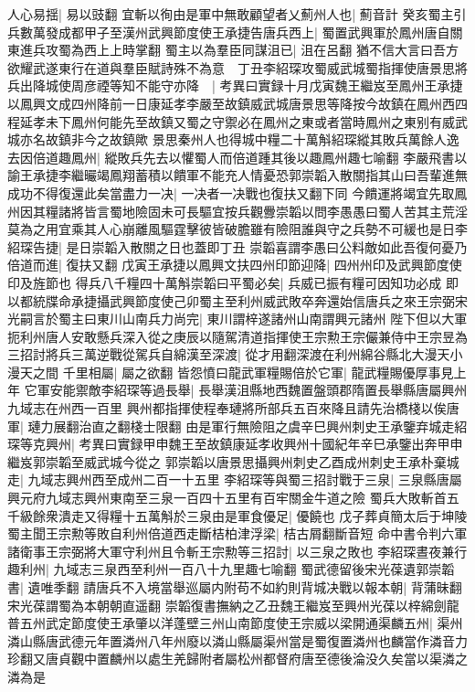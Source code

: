 人心易揺|{
	易以豉翻}
宜斬以徇由是軍中無敢顧望者乂薊州人也|{
	薊音計}
癸亥蜀主引兵數萬發成都甲子至漢州武興節度使王承捷告唐兵西上|{
	蜀置武興軍於鳳州唐自關東進兵攻蜀為西上上時掌翻}
蜀主以為羣臣同謀沮已|{
	沮在呂翻}
猶不信大言曰吾方欲耀武遂東行在道與羣臣賦詩殊不為意　丁丑李紹琛攻蜀威武城蜀指揮使唐景思將兵出降城使周彦禋等知不能守亦降　|{
	考異曰實録十月戊寅魏王繼岌至鳳州王承捷以鳳興文成四州降前一日康延孝李嚴至故鎮威武城唐景思等降按今故鎮在鳳州西四程延孝未下鳳州何能先至故鎮又蜀之守禦必在鳳州之東或者當時鳳州之東别有威武城亦名故鎮非今之故鎮歟}
景思秦州人也得城中糧二十萬斛紹琛縱其敗兵萬餘人逸去因倍道趣鳳州|{
	縱敗兵先去以懼蜀人而倍道踵其後以趣鳳州趣七喻翻}
李嚴飛書以諭王承捷李繼曮竭鳳翔蓄積以饋軍不能充人情憂恐郭崇韜入散關指其山曰吾輩進無成功不得復還此矣當盡力一决|{
	一决者一决戰也復扶又翻下同}
今饋運將竭宜先取鳳州因其糧諸將皆言蜀地險固未可長驅宜按兵觀釁崇韜以問李愚愚曰蜀人苦其主荒淫莫為之用宜乘其人心崩離風驅霆擊彼皆破膽雖有險阻誰與守之兵勢不可緩也是日李紹琛告捷|{
	是日崇韜入散關之日也蓋即丁丑}
崇韜喜謂李愚曰公料敵如此吾復何憂乃倍道而進|{
	復扶又翻}
戊寅王承捷以鳳興文扶四州印節迎降|{
	四州州印及武興節度使印及旌節也}
得兵八千糧四十萬斛崇韜曰平蜀必矣|{
	兵威已振有糧可因知功必成}
即以都統牒命承捷攝武興節度使己卯蜀主至利州威武敗卒奔還始信唐兵之來王宗弼宋光嗣言於蜀主曰東川山南兵力尚完|{
	東川謂梓遂諸州山南謂興元諸州}
陛下但以大軍扼利州唐人安敢懸兵深入從之庚辰以隨駕清道指揮使王宗勲王宗儼兼侍中王宗昱為三招討將兵三萬逆戰從駕兵自綿漢至深渡|{
	從才用翻深渡在利州綿谷縣北大漫天小漫天之間}
千里相屬|{
	屬之欲翻}
皆怨憤曰龍武軍糧賜倍於它軍|{
	龍武糧賜優厚事見上年}
它軍安能禦敵李紹琛等過長舉|{
	長舉漢沮縣地西魏置盤頭郡隋置長舉縣唐屬興州九域志在州西一百里}
興州都指揮使程奉璉將所部兵五百來降且請先治橋棧以俟唐軍|{
	璉力展翻治直之翻棧士限翻}
由是軍行無險阻之虞辛巳興州刺史王承鑒弃城走紹琛等克興州|{
	考異曰實録甲申魏王至故鎮康延孝收興州十國紀年辛巳承鑒出奔甲申繼岌郭崇韜至威武城今從之}
郭崇韜以唐景思攝興州刺史乙酉成州刺史王承朴棄城走|{
	九域志興州西至成州二百一十五里}
李紹琛等與蜀三招討戰于三泉|{
	三泉縣唐屬興元府九域志興州東南至三泉一百四十五里有百牢關金牛道之險}
蜀兵大敗斬首五千級餘衆潰走又得糧十五萬斛於三泉由是軍食優足|{
	優饒也}
戊子葬貞簡太后于坤陵蜀主聞王宗勲等敗自利州倍道西走斷桔柏津浮梁|{
	桔古屑翻斷音短}
命中書令判六軍諸衛事王宗弼將大軍守利州且令斬王宗勲等三招討|{
	以三泉之敗也}
李紹琛晝夜兼行趣利州|{
	九域志三泉西至利州一百八十九里趣七喻翻}
蜀武德留後宋光葆遺郭崇韜書|{
	遺唯季翻}
請唐兵不入境當舉巡屬内附苟不如約則背城决戰以報本朝|{
	背蒲昧翻宋光葆謂蜀為本朝朝直遥翻}
崇韜復書撫納之乙丑魏王繼岌至興州光葆以梓綿劍龍普五州武定節度使王承肇以洋蓬壁三州山南節度使王宗威以梁開通渠麟五州|{
	渠州潾山縣唐武德元年置潾州八年州廢以潾山縣屬渠州當是蜀復置潾州也麟當作潾音力珍翻又唐貞觀中置麟州以處生羌歸附者屬松州都督府唐至德後淪没久矣當以渠潾之潾為是}
